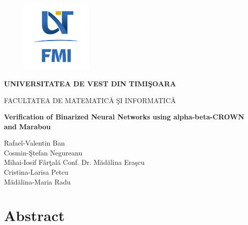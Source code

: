 \documentclass[12pt,a4paper]{report}
\begin{document}
\thispagestyle{empty}
\begin{center}
\begin{figure}[h!]
\vspace{-20pt}
\begin{center}
\includegraphics[width=100pt]{FMI-03.png}
\end{center}
\end{figure}

{\large{\bf UNIVERSITATEA DE VEST DIN TIMI\c SOARA

FACULTATEA DE MATEMATIC\u A \c SI INFORMATIC\u A}}

\vspace{65pt}
{\huge {\bf Verification of Binarized Neural Networks using alpha-beta-CROWN and Marabou}}

\vspace{65pt}
\end{center}

\noindent Rafael-Valentin Ban\\
\noindent Cosmin-\c Stefan Negureanu\\
\noindent Mihai-Iosif F\^{a}r\c tal\u a \hfill Conf. Dr. M\u ad\u alina Era\c scu\\
\noindent Cristina-Larisa Petcu\\
\noindent M\u ad\u alina-Maria Radu\\

\vspace{65pt}
\section*{Abstract}
\tableofcontents
\end{document}
